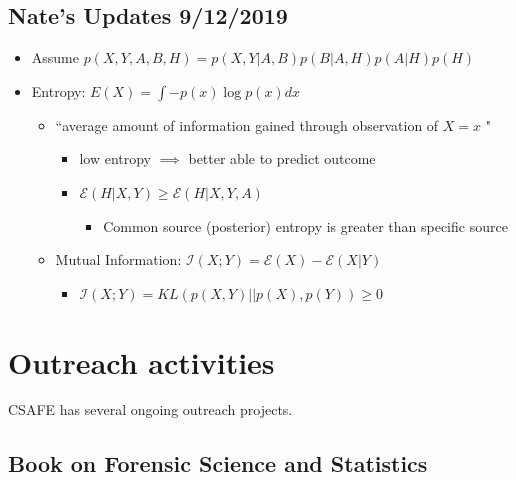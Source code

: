 \documentclass[]{book}
\providecommand{\tightlist}{%
  \setlength{\itemsep}{0pt}\setlength{\parskip}{0pt}}
\begin{document}
\hypertarget{nates-updates-9122019}{%
\section{Nate's Updates 9/12/2019}\label{nates-updates-9122019}}

\begin{itemize}
\tightlist
\item
  Assume \(p(X,Y,A,B,H) = p(X,Y|A,B)p(B|A,H)p(A|H)p(H)\)
\item
  Entropy: \(E(X) = \int -p(x)\log p(x) dx\)

  \begin{itemize}
  \tightlist
  \item
    ``average amount of information gained through observation of \(X = x\) "

    \begin{itemize}
    \tightlist
    \item
      low entropy \(\implies\) better able to predict outcome
    \item
      \(\mathcal{E}(H|X,Y) \geq \mathcal{E}(H|X,Y,A)\)

      \begin{itemize}
      \tightlist
      \item
        Common source (posterior) entropy is greater than specific source
      \end{itemize}
    \end{itemize}
  \item
    Mutual Information: \(\mathcal{I}(X;Y) = \mathcal{E}(X) - \mathcal{E}(X|Y)\)

    \begin{itemize}
    \tightlist
    \item
      \(\mathcal{I}(X;Y) = KL(p(X,Y)||p(X),p(Y)) \geq 0\)
    \end{itemize}
  \end{itemize}
\end{itemize}

\hypertarget{outreach-activities}{%
\chapter{Outreach activities}\label{outreach-activities}}

CSAFE has several ongoing outreach projects.

\hypertarget{book-on-forensic-science-and-statistics}{%
\section{Book on Forensic Science and Statistics}\label{book-on-forensic-science-and-statistics}}
\end{document}
